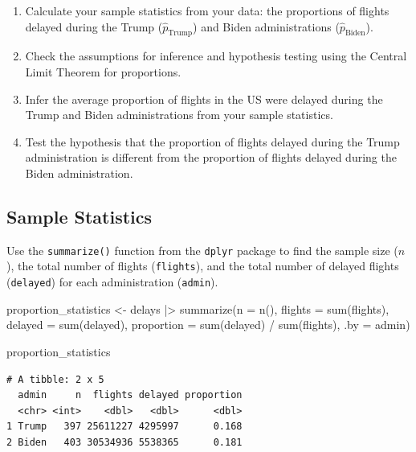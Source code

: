 \documentclass[
  letterpaper,
  DIV=11,
  numbers=noendperiod]{scrartcl}
\newenvironment{Shaded}{\begin{snugshade}}{\end{snugshade}}
\newcommand{\AttributeTok}[1]{\textcolor[rgb]{0.40,0.45,0.13}{#1}}
\newcommand{\FunctionTok}[1]{\textcolor[rgb]{0.28,0.35,0.67}{#1}}
\newcommand{\NormalTok}[1]{\textcolor[rgb]{0.00,0.23,0.31}{#1}}
\newcommand{\OtherTok}[1]{\textcolor[rgb]{0.00,0.23,0.31}{#1}}
\newcommand{\SpecialCharTok}[1]{\textcolor[rgb]{0.37,0.37,0.37}{#1}}
\newcommand{\StringTok}[1]{\textcolor[rgb]{0.13,0.47,0.30}{#1}}
\begin{document}
\begin{enumerate}
\def\labelenumi{\arabic{enumi}.}
\item
  Calculate your sample statistics from your data: the proportions of
  flights delayed during the Trump (\(\hat{p}_{\text{Trump}}\)) and
  Biden administrations (\(\hat{p}_{\text{Biden}}\)).
\item
  Check the assumptions for inference and hypothesis testing using the
  Central Limit Theorem for proportions.
\item
  Infer the average proportion of flights in the US were delayed during
  the Trump and Biden administrations from your sample statistics.
\item
  Test the hypothesis that the proportion of flights delayed during the
  Trump administration is different from the proportion of flights
  delayed during the Biden administration.
\end{enumerate}

\subsection{Sample Statistics}\label{sample-statistics}

Use the \texttt{summarize()} function from the \texttt{dplyr} package to
find the sample size (\(n\)), the total number of flights
(\texttt{flights}), and the total number of delayed flights
(\texttt{delayed}) for each administration (\texttt{admin}).

\begin{Shaded}
\begin{Highlighting}[]
\NormalTok{proportion\_statistics }\OtherTok{\textless{}{-}}\NormalTok{ delays }\SpecialCharTok{|\textgreater{}}
  \FunctionTok{summarize}\NormalTok{(}\AttributeTok{n =} \FunctionTok{n}\NormalTok{(), }
            \AttributeTok{flights =} \FunctionTok{sum}\NormalTok{(flights), }
            \AttributeTok{delayed =} \FunctionTok{sum}\NormalTok{(delayed), }
            \AttributeTok{proportion =} \FunctionTok{sum}\NormalTok{(delayed) }\SpecialCharTok{/} \FunctionTok{sum}\NormalTok{(flights),}
            \AttributeTok{.by =} \StringTok{\textquotesingle{}admin\textquotesingle{}}\NormalTok{)}

\NormalTok{proportion\_statistics}
\end{Highlighting}
\end{Shaded}

\begin{verbatim}
# A tibble: 2 x 5
  admin     n  flights delayed proportion
  <chr> <int>    <dbl>   <dbl>      <dbl>
1 Trump   397 25611227 4295997      0.168
2 Biden   403 30534936 5538365      0.181
\end{verbatim}
\end{document}
